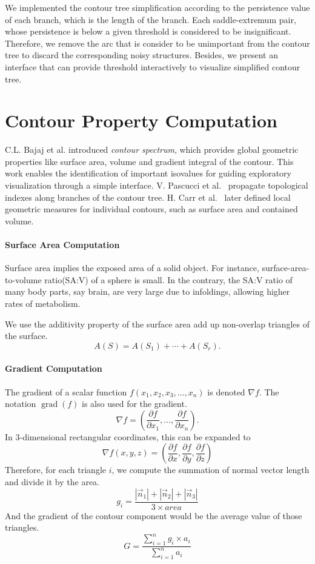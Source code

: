 \documentclass[11pt, b5paper]{report}
\begin{document}
We implemented the contour tree simplification according to the persistence 
value of each branch, which is the length of the branch. Each saddle-extremum
pair, whose persistence is below a given threshold is considered to be 
insignificant. Therefore, we remove the arc that is consider to be 
unimportant from the contour tree to discard the corresponding noisy 
structures. Besides, we present an interface that can provide threshold
interactively to visualize simplified contour tree.


\section{Contour Property Computation}
C.L. Bajaj et al. \cite{bajaj1997contour} introduced \emph{contour spectrum},
which provides global geometric properties like surface area, volume and
gradient integral of the contour. This work enables the identification
of important isovalues for guiding exploratory visualization through a
simple interface. V. Pascucci et al.~\cite{pascucci2002efficient} propagate 
topological indexes along branches of the contour tree. H. Carr et al.~
\cite{carr2004simplifying} later defined local geometric measures for 
individual contours, such as surface area and contained volume.

\paragraph{Surface Area Computation}

Surface area implies the exposed area of a solid object. For instance, 
surface-area-to-volume ratio(SA:V) of a sphere is small. In the contrary, 
the SA:V ratio of many body parts, say brain, are very large due to 
infoldings, allowing higher rates of metabolism.

We use the additivity property of the surface area add up non-overlap 
triangles of the surface.
$$ A(S) = A(S_1) + \cdots + A(S_r). $$
\paragraph{Gradient Computation}

The gradient of a scalar function $f(x_1, x_2, x_3, \dots, x_n)$ is denoted 
$\nabla f$. The notation $\operatorname{grad}(f)$ is also used for the 
gradient.
$$ \nabla f  = \left(\frac{\partial f}{\partial x_1 },\dots,\frac{\partial f}
{\partial x_n }  \right). $$
In 3-dimensional rectangular coordinates, this can be expanded to
$$\nabla f(x, y, z) = 
\left(\frac{\partial f}{\partial x},
\frac{\partial f}{\partial y},
\frac{\partial f}{\partial z}\right)$$
Therefore, for each triangle $i$, we compute the summation of normal vector 
length and divide it by the area.
$$g_i = \frac{|\vec n_1|+|\vec n_2|+|\vec n_3|}{3\times area}$$
And the gradient of the contour component would be the average value of 
those triangles.
$$G = \frac{\sum_{i=1}^n g_i \times a_i}{\sum_{i=1}^n a_i}$$
\end{document}
